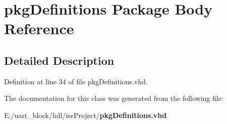 \section{pkg\-Definitions Package Body Reference}
\label{class__pkg_definitions}


\subsection{Detailed Description}


Definition at line 34 of file pkg\-Definitions.\-vhd.



The documentation for this class was generated from the following file\-:\begin{DoxyCompactItemize}
\item 
E\-:/uart\-\_\-block/hdl/ise\-Project/{\bf pkg\-Definitions.\-vhd}\end{DoxyCompactItemize}
